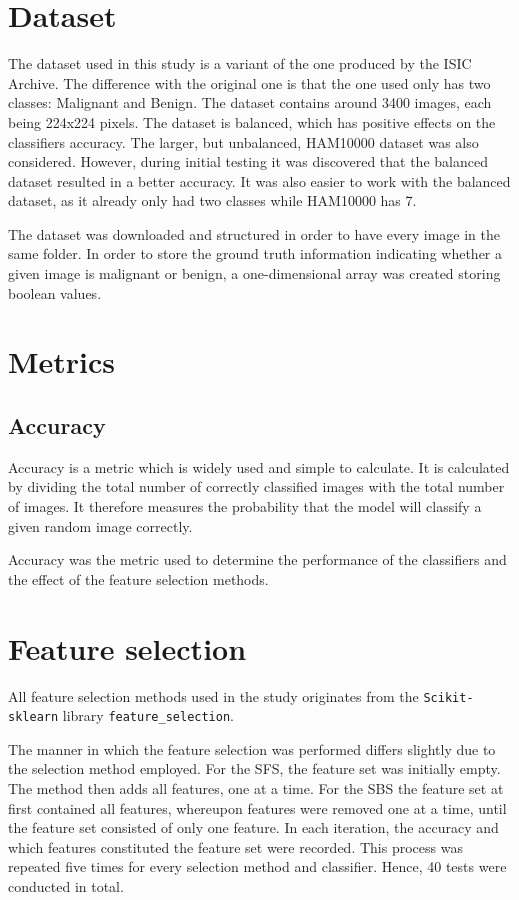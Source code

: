 \documentclass{kththesis}
\begin{document}

\section{Dataset}

The dataset used in this study is a variant of the one produced by the ISIC Archive. The difference with the original one is that the one used only has two classes: Malignant and Benign. The dataset contains around 3400 images, each being 224x224 pixels. The dataset is balanced, which has positive effects on the classifiers accuracy. The larger, but unbalanced, HAM10000 dataset was also considered. However, during initial testing it was discovered that the balanced dataset resulted in a better accuracy. It was also easier to work with the balanced dataset, as it already only had two classes while HAM10000 has 7.

The dataset was downloaded and structured in order to have every image in the same folder. In order to store the ground truth information indicating whether a given image is malignant or benign, a one-dimensional array was created storing boolean values.

\section{Metrics}

\subsection{Accuracy}

Accuracy is a metric which is widely used and simple to calculate.  
It is calculated by dividing the total number of correctly classified images with the total number of images. 
It therefore measures the probability that the model will classify a given random image correctly. \parencite{takiddin2021artificial}

Accuracy was the metric used to determine the performance of the classifiers and the effect of the feature selection methods.


\section{Feature selection}

All feature selection methods used in the study originates from the \verb|Scikit-sklearn| library \verb|feature_selection|.

The manner in which the feature  selection was performed differs slightly due to the selection method employed. For the SFS, the feature set was initially empty. The method then adds all features, one at a time. For the SBS the feature set at first contained all features, whereupon features were removed one at a time, until the feature set consisted of only one feature. In each iteration, the accuracy and which features constituted the feature set were recorded. 
This process was repeated five times for every selection method and classifier. Hence, 40 tests were conducted in total.
\end{document}
